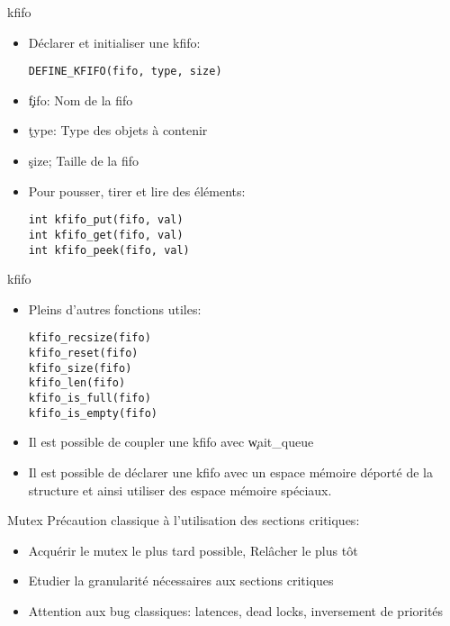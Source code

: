 \begin{frame}[fragile=singleslide]{kfifo}
  \begin{itemize}
  \item Déclarer et initialiser une kfifo: 
    \begin{lstlisting} 
DEFINE_KFIFO(fifo, type, size)
    \end{lstlisting} 
  \item \c{fifo}: Nom de la fifo
  \item \c{type}: Type des objets à contenir
  \item \c{size}; Taille de la fifo
  \item Pour pousser, tirer et lire des éléments:
    \begin{lstlisting} 
int kfifo_put(fifo, val) 
int kfifo_get(fifo, val)
int kfifo_peek(fifo, val)
    \end{lstlisting} 
  \end{itemize}
\end{frame}

\begin{frame}[fragile=singleslide]{kfifo}
  \begin{itemize}
  \item Pleins d'autres fonctions utiles:
    \begin{lstlisting}
kfifo_recsize(fifo)
kfifo_reset(fifo) 
kfifo_size(fifo)  
kfifo_len(fifo)
kfifo_is_full(fifo)
kfifo_is_empty(fifo)
    \end{lstlisting} 
  \item Il est possible de coupler une kfifo avec \c{wait_queue}
  \item Il est  possible de déclarer une kfifo  avec un espace mémoire
    déporté  de la  structure  et ainsi  utiliser  des espace  mémoire
    spéciaux.
  \end{itemize} 
\end{frame} 

\begin{frame}{Mutex}
  Précaution classique à l'utilisation des sections critiques:
  \begin{itemize}
  \item Acquérir le mutex le plus tard possible, Relâcher le plus tôt
  \item Etudier la granularité nécessaires aux sections critiques
  \item   Attention  aux   bug  classiques:   latences,   dead  locks,
    inversement de priorités
  \end{itemize} 
\end{frame}

